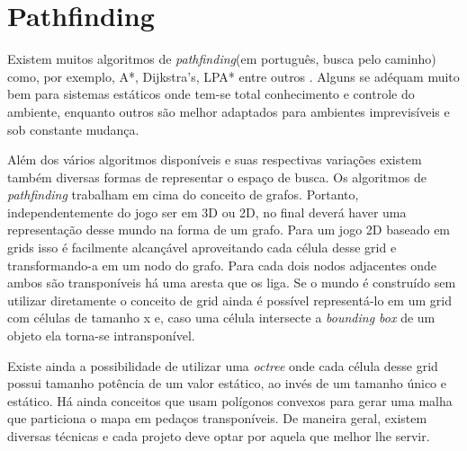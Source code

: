 \documentclass[12pt, 
openright, 
oneside, 
a4paper,    
brazil]{facom-ufu-abntex2}
\begin{document}


\section{Pathfinding}
Existem muitos algoritmos de \textit{pathfinding}(em português, busca pelo caminho) como, por exemplo, A*, Dijkstra's, LPA* entre outros . Alguns se adéquam muito bem para sistemas estáticos onde tem-se total conhecimento e controle do ambiente, enquanto outros são melhor adaptados para ambientes imprevisíveis e sob constante mudança.

Além dos vários algoritmos disponíveis e suas respectivas variações existem também diversas formas de representar o espaço de busca. Os algoritmos de \textit{pathfinding} trabalham em cima do conceito de grafos. Portanto, independentemente do jogo ser em 3D ou 2D, no final deverá haver uma representação desse mundo na forma de um grafo. Para um jogo 2D baseado em grids isso é facilmente alcançável aproveitando cada célula desse grid e transformando-a em um nodo do grafo. Para cada dois nodos adjacentes onde ambos são transponíveis há uma aresta que os liga. Se o mundo é construído sem utilizar diretamente o conceito de grid ainda é possível representá-lo em um grid com células de tamanho x e, caso uma célula intersecte a \textit{bounding box} de um objeto
ela torna-se intransponível.

Existe ainda a possibilidade de utilizar uma \textit{octree} onde cada célula desse grid possui tamanho potência de um valor estático, ao invés de um tamanho único e estático. Há ainda conceitos que usam polígonos convexos para gerar uma malha que particiona o mapa em pedaços transponíveis. De maneira geral, existem diversas técnicas e cada projeto deve optar por aquela que melhor lhe servir.
\end{document}
